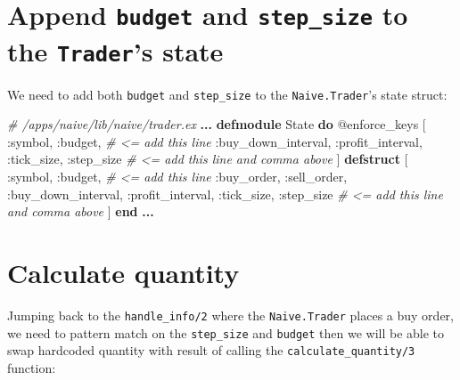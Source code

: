 \documentclass[
  oneside]{book}
\newenvironment{Shaded}{\begin{snugshade}}{\end{snugshade}}
\newcommand{\CommentTok}[1]{\textcolor[rgb]{0.56,0.35,0.01}{\textit{#1}}}
\newcommand{\ConstantTok}[1]{\textcolor[rgb]{0.00,0.00,0.00}{#1}}
\newcommand{\KeywordTok}[1]{\textcolor[rgb]{0.13,0.29,0.53}{\textbf{#1}}}
\newcommand{\NormalTok}[1]{#1}
\newcommand{\OperatorTok}[1]{\textcolor[rgb]{0.81,0.36,0.00}{\textbf{#1}}}
\newcommand{\OtherTok}[1]{\textcolor[rgb]{0.56,0.35,0.01}{#1}}
\newcommand{\VariableTok}[1]{\textcolor[rgb]{0.00,0.00,0.00}{#1}}
\begin{document}
\hypertarget{append-budget-and-step_size-to-the-traders-state}{%
\section{\texorpdfstring{Append \texttt{budget} and \texttt{step\_size} to the \texttt{Trader}'s state}{Append budget and step\_size to the Trader's state}}\label{append-budget-and-step_size-to-the-traders-state}}

We need to add both \texttt{budget} and \texttt{step\_size} to the \texttt{Naive.Trader}'s state struct:

\begin{Shaded}
\begin{Highlighting}[]
  \CommentTok{\# /apps/naive/lib/naive/trader.ex}
  \OperatorTok{...}
  \KeywordTok{defmodule} \ConstantTok{State} \KeywordTok{do}
    \OtherTok{@enforce\_keys}\NormalTok{ [}
      \VariableTok{:symbol}\NormalTok{,}
      \VariableTok{:budget}\NormalTok{, }\CommentTok{\# \textless{}= add this line}
      \VariableTok{:buy\_down\_interval}\NormalTok{,}
      \VariableTok{:profit\_interval}\NormalTok{,}
      \VariableTok{:tick\_size}\NormalTok{,}
      \VariableTok{:step\_size} \CommentTok{\# \textless{}= add this line and comma above}
\NormalTok{    ]}
    \KeywordTok{defstruct}\NormalTok{ [}
      \VariableTok{:symbol}\NormalTok{,}
      \VariableTok{:budget}\NormalTok{, }\CommentTok{\# \textless{}= add this line}
      \VariableTok{:buy\_order}\NormalTok{,}
      \VariableTok{:sell\_order}\NormalTok{,}
      \VariableTok{:buy\_down\_interval}\NormalTok{,}
      \VariableTok{:profit\_interval}\NormalTok{,}
      \VariableTok{:tick\_size}\NormalTok{,}
      \VariableTok{:step\_size} \CommentTok{\# \textless{}= add this line and comma above}
\NormalTok{    ]}
  \KeywordTok{end}
  \OperatorTok{...}
\end{Highlighting}
\end{Shaded}

\hypertarget{calculate-quantity}{%
\section{Calculate quantity}\label{calculate-quantity}}

Jumping back to the \texttt{handle\_info/2} where the \texttt{Naive.Trader} places a buy order, we need to pattern match on the \texttt{step\_size} and \texttt{budget} then we will be able to swap hardcoded quantity with result of calling the \texttt{calculate\_quantity/3} function:
\end{document}
